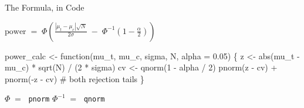 \documentclass[
  ignorenonframetext,
  aspectratio=169,
]{beamer}
\newenvironment{Shaded}{\begin{snugshade}}{\end{snugshade}}
\newcommand{\AttributeTok}[1]{\textcolor[rgb]{0.40,0.45,0.13}{#1}}
\newcommand{\CommentTok}[1]{\textcolor[rgb]{0.37,0.37,0.37}{#1}}
\newcommand{\ControlFlowTok}[1]{\textcolor[rgb]{0.00,0.23,0.31}{#1}}
\newcommand{\DecValTok}[1]{\textcolor[rgb]{0.68,0.00,0.00}{#1}}
\newcommand{\FloatTok}[1]{\textcolor[rgb]{0.68,0.00,0.00}{#1}}
\newcommand{\FunctionTok}[1]{\textcolor[rgb]{0.28,0.35,0.67}{#1}}
\newcommand{\NormalTok}[1]{\textcolor[rgb]{0.00,0.23,0.31}{#1}}
\newcommand{\OtherTok}[1]{\textcolor[rgb]{0.00,0.23,0.31}{#1}}
\newcommand{\SpecialCharTok}[1]{\textcolor[rgb]{0.37,0.37,0.37}{#1}}
\begin{document}
\begin{frame}[fragile]{The Formula, in Code}
\label{the-formula-in-code}
\vspace{0.6em}

\begin{center}
$\displaystyle \text{power} \;=\; \Phi\!\left( \frac{|\mu_t - \mu_c|\sqrt{N}}{2\sigma} \;-\; \Phi^{-1}\!\left(1-\frac{\alpha}{2}\right) \right)$
\end{center}

\vspace{0.9em}

\begin{Shaded}
\begin{Highlighting}[]
\NormalTok{power\_calc }\OtherTok{\textless{}{-}} \ControlFlowTok{function}\NormalTok{(mu\_t, mu\_c, sigma, N, }\AttributeTok{alpha =} \FloatTok{0.05}\NormalTok{) \{}
\NormalTok{    z }\OtherTok{\textless{}{-}} \FunctionTok{abs}\NormalTok{(mu\_t }\SpecialCharTok{{-}}\NormalTok{ mu\_c) }\SpecialCharTok{*} \FunctionTok{sqrt}\NormalTok{(N) }\SpecialCharTok{/}\NormalTok{ (}\DecValTok{2} \SpecialCharTok{*}\NormalTok{ sigma)}
\NormalTok{    cv }\OtherTok{\textless{}{-}} \FunctionTok{qnorm}\NormalTok{(}\DecValTok{1} \SpecialCharTok{{-}}\NormalTok{ alpha }\SpecialCharTok{/} \DecValTok{2}\NormalTok{)}
    \FunctionTok{pnorm}\NormalTok{(z }\SpecialCharTok{{-}}\NormalTok{ cv) }\SpecialCharTok{+} \FunctionTok{pnorm}\NormalTok{(}\SpecialCharTok{{-}}\NormalTok{z }\SpecialCharTok{{-}}\NormalTok{ cv) }\CommentTok{\# both rejection tails}
\NormalTok{\}}
\end{Highlighting}
\end{Shaded}

\vspace{0.9em}

\begin{center}
\large $\Phi \;=\;$ \texttt{pnorm} \qquad\qquad $\Phi^{-1} \;=\;$ \texttt{qnorm}
\end{center}
\end{frame}
\end{document}
